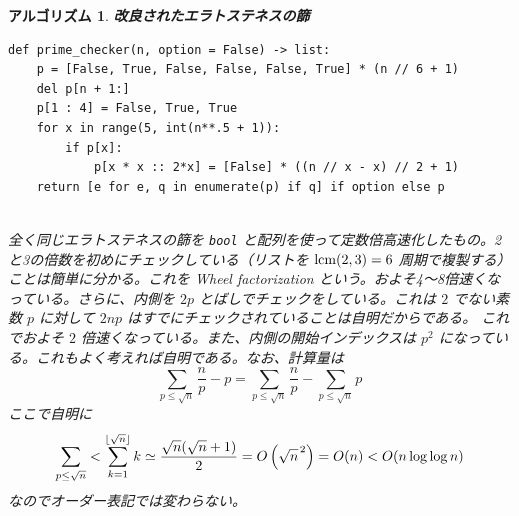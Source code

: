 \documentclass[12pt, a4j]{ltjsarticle}
\newtheorem{alg}[thm]{アルゴリズム}
\begin{document}
\begin{alg} {\bf 改良されたエラトステネスの篩}\\\upshape
\begin{lstlisting}
def prime_checker(n, option = False) -> list:
    p = [False, True, False, False, False, True] * (n // 6 + 1)
    del p[n + 1:]
    p[1 : 4] = False, True, True
    for x in range(5, int(n**.5 + 1)):
        if p[x]:
            p[x * x :: 2*x] = [False] * ((n // x - x) // 2 + 1)
    return [e for e, q in enumerate(p) if q] if option else p
\end{lstlisting}
\quad\\
全く同じエラトステネスの篩を \lstinline{bool}
と配列を使って定数倍高速化したもの。2と3の倍数を初めにチェックしている（リストを ${\rm lcm}(2,3)=6$ 周期で複製する）ことは簡単に分かる。これを Wheel factorization という。およそ4〜8倍速くなっている。さらに、内側を $2p$ とばしでチェックをしている。これは $2$ でない素数 $p$ に対して $2np$ はすでにチェックされていることは自明だからである。 これでおよそ $2$ 倍速くなっている。また、内側の開始インデックスは $p^2$ になっている。これもよく考えれば自明である。なお、計算量は
\begin{equation}
\sum_{p\le\sqrt{n}}\frac{n}{p}-p = \sum_{p\le\sqrt{n}}\frac{n}{p}-\sum_{p\le\sqrt{n}}p
\end{equation}
ここで自明に
\begin{equation}
  \sum_{p\le\sqrt{n}} < \sum_{k=1}^{\lfloor\sqrt{n}\rfloor}k \simeq \frac{\sqrt{n}(\sqrt{n}+1)}{2} = O\left(\sqrt{n}^{\hspace{0.4mm}2}\right) = O(n) < O(n\log\log n)
\end{equation}
なのでオーダー表記では変わらない。
\end{alg}

\newpage
\end{document}
